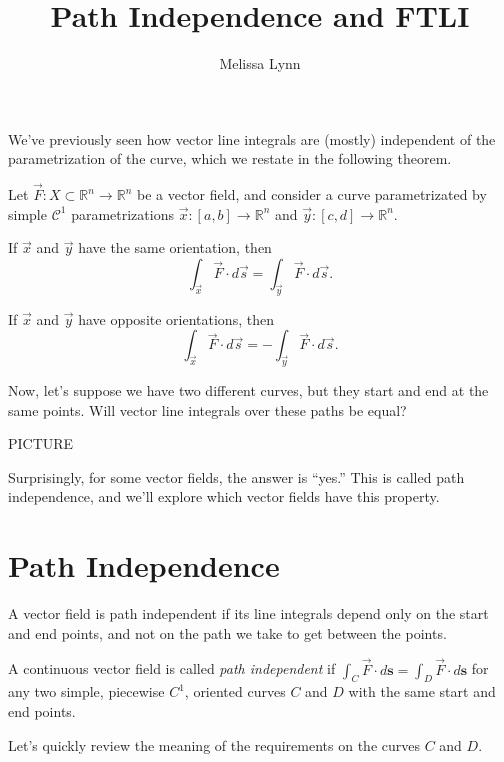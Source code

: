 \documentclass{ximera}
\title{Path Independence and FTLI}
\author{Melissa Lynn}
\begin{document}
  
\begin{abstract}  
\end{abstract}  
\maketitle  

We've previously seen how vector line integrals are (mostly) independent of the parametrization of the curve, which we restate in the following theorem.

\begin{theorem}
Let $\vec{F}:X\subset\mathbb{R}^n\rightarrow\mathbb{R}^n$ be a vector field, and consider a curve parametrizated by simple $\mathcal{C}^1$ parametrizations $\vec{x}:[a,b]\rightarrow\mathbb{R}^n$ and $\vec{y}:[c,d]\rightarrow\mathbb{R}^n$. 

If $\vec{x}$ and $\vec{y}$ have the same orientation, then
\[
\int_{\vec{x}}\vec{F}\cdot d\vec{s} = \int_{\vec{y}}\vec{F}\cdot d\vec{s}.
\]

If $\vec{x}$ and $\vec{y}$ have opposite orientations, then
\[
\int_{\vec{x}}\vec{F}\cdot d\vec{s} = -\int_{\vec{y}}\vec{F}\cdot d\vec{s}.
\]
\end{theorem}

Now, let's suppose we have two different curves, but they start and end at the same points. Will vector line integrals over these paths be equal?

PICTURE

Surprisingly, for some vector fields, the answer is ``yes.'' This is called path independence, and we'll explore which vector fields have this property.

\section*{Path Independence}

A vector field is path independent if its line integrals depend only on the start and end points, and not on the path we take to get between the points.

\begin{definition}
A continuous vector field is called \emph{path independent} if $\int_C \vec{F}\cdot d\textbf{s}=\int_D \vec{F}\cdot d\textbf{s}$ for any two simple, piecewise $C^1$, oriented curves $C$ and $D$ with the same start and end points.
\end{definition}

Let's quickly review the meaning of the requirements on the curves $C$ and $D$.
\end{document}
